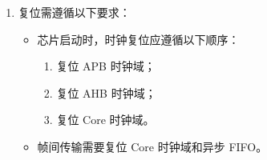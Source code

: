 \documentclass[main\_\_CN.tex]{subfiles}
\begin{document}
\begin{enumerate}
    RX 模块中的具体操作步骤为：
    \begin{itemize}
        \item 清除 \hyperref[fielddesc:PCRPARLCLKRXEN]{PCR\_PARL\_CLK\_RX\_EN} 关闭 RX Core 时钟域；
        \item 向 \hyperref[fielddesc:PARLIORXSTART]{PARL\_IO\_RX\_START} 写 1；
        \item 置位 \hyperref[fielddesc:PCRPARLCLKRXEN]{PCR\_PARL\_CLK\_RX\_EN} 打开 RX Core 时钟域；
        \item 操作外部设备，使其开始发送数据；
        \item 清除 \hyperref[fielddesc:PCRPARLCLKRXEN]{PCR\_PARL\_CLK\_RX\_EN} 关闭 RX Core 时钟域；
        \item 向 \hyperref[fielddesc:PARLIOTXSTART]{PARL\_IO\_TX\_START} 写 0。
    \end{itemize}
    TX 模块中的具体操作步骤为：
    \begin{itemize}
        \item 清除 \hyperref[fielddesc:PCRPARLCLKTXEN]{PCR\_PARL\_CLK\_TX\_EN} 关闭 TX Core 时钟域；
        \item 向 \hyperref[fielddesc:PARLIOTXSTART]{PARL\_IO\_TX\_START} 写 1；
        \item 置位 \hyperref[fielddesc:PCRPARLCLKTXEN]{PCR\_PARL\_CLK\_TX\_EN} 打开 TX Core 时钟域；
        \item 操作外部设备，使其开始接收数据；
        \item 清除 \hyperref[fielddesc:PCRPARLCLKTXEN]{PCR\_PARL\_CLK\_TX\_EN} 关闭 TX Core 时钟域；
        \item 向 \hyperref[fielddesc:PARLIOTXSTART]{PARL\_IO\_TX\_START} 写 0。
    \end{itemize}
    
    \item 复位需遵循以下要求：
    \begin{itemize}
        \item 芯片启动时，时钟复位应遵循以下顺序：
        \begin{enumerate}
            \item 复位 APB 时钟域；
            \item 复位 AHB 时钟域；
            \item 复位 Core 时钟域。
        \end{enumerate}
        \item 帧间传输需要复位 Core 时钟域和异步 FIFO。
    \end{itemize}
\end{enumerate}
\end{document}

